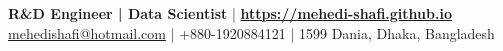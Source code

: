 \documentclass[a4paper]{styles/deedy-resume} %
\begin{document}


\newcommand*{\ExpreiencePath}{sections/experiences}
\newcommand*{\ProjectPath}{sections/projects}
\newcommand*{\Certifications}{sections/certifications}
\newcommand*{\Achievements}{sections/achievements}
\newcommand*{\Lectures}{sections/lectures}



\lastupdated %

{{\bf R\&D Engineer | Data Scientist} |
\href{https://mehedi-shafi.github.io}{\bf https://mehedi-shafi.github.io} \\
\href{mailto:mehedishafi@hotmail.com}{mehedishafi@hotmail.com} | +880-1920884121 | 1599 Dania, Dhaka, Bangladesh}

\end{document}
